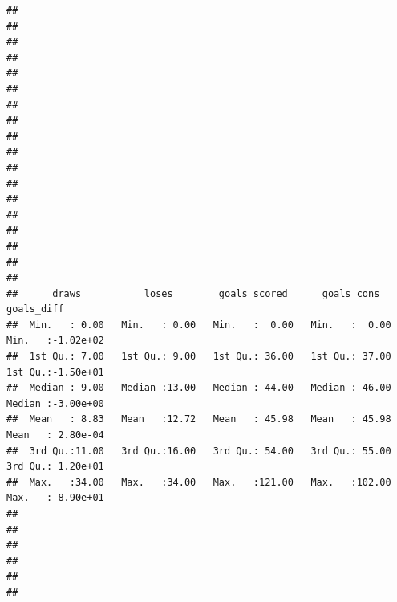 \documentclass{article}\usepackage[]{graphicx}\usepackage[]{color}
\makeatletter
\newenvironment{kframe}{%
 \def\at@end@of@kframe{}%
 \ifinner\ifhmode%
  \def\at@end@of@kframe{\end{minipage}}%
  \begin{minipage}{\columnwidth}%
 \fi\fi%
 \def\FrameCommand##1{\hskip\@totalleftmargin \hskip-\fboxsep
 \colorbox{shadecolor}{##1}\hskip-\fboxsep
     \hskip-\linewidth \hskip-\@totalleftmargin \hskip\columnwidth}%
 \MakeFramed {\advance\hsize-\width
   \@totalleftmargin\z@ \linewidth\hsize
   \@setminipage}}%
 {\par\unskip\endMakeFramed%
 \at@end@of@kframe}
\newenvironment{knitrout}{}{} %
\makeatother
\begin{document}
\begin{knitrout}
\begin{kframe}
\begin{verbatim}
##                                                                                 
##                                                                                 
##                                                                                 
##                                                                                 
##                                                                                 
##                                                                                 
##                                                                                 
##                                                                                 
##                                                                                 
##                                                                                 
##                                                                                 
##                                                                                 
##                                                                                 
##                                                                                 
##                                                                                 
##                                                                                 
##                                                                                 
##                                                                                 
##      draws           loses        goals_scored      goals_cons       goals_diff       
##  Min.   : 0.00   Min.   : 0.00   Min.   :  0.00   Min.   :  0.00   Min.   :-1.02e+02  
##  1st Qu.: 7.00   1st Qu.: 9.00   1st Qu.: 36.00   1st Qu.: 37.00   1st Qu.:-1.50e+01  
##  Median : 9.00   Median :13.00   Median : 44.00   Median : 46.00   Median :-3.00e+00  
##  Mean   : 8.83   Mean   :12.72   Mean   : 45.98   Mean   : 45.98   Mean   : 2.80e-04  
##  3rd Qu.:11.00   3rd Qu.:16.00   3rd Qu.: 54.00   3rd Qu.: 55.00   3rd Qu.: 1.20e+01  
##  Max.   :34.00   Max.   :34.00   Max.   :121.00   Max.   :102.00   Max.   : 8.90e+01  
##                                                                                       
##                                                                                       
##                                                                                       
##                                                                                       
##                                                                                       
##                                                                                       

\end{verbatim}
\end{kframe}
\end{knitrout}
\end{document}
